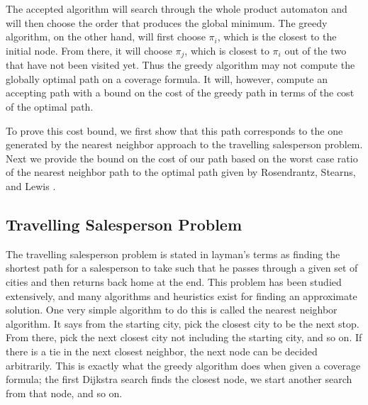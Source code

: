 The accepted algorithm will search through the whole product automaton and will then choose the order that produces the global minimum. The greedy algorithm, on the other hand, will first choose $\pi_i$, which is the closest to the initial node. From there, it will choose $\pi_j$, which is closest to $\pi_i$ out of the two that have not been visited yet. Thus the greedy algorithm may not compute the globally optimal path on a coverage formula. It will, however, compute an accepting path with a bound on the cost of the greedy path in terms of the cost of the optimal path. 

To prove this cost bound, we first show that this path corresponds to the one generated by the nearest neighbor approach to the travelling salesperson problem. Next we provide the bound on the cost of our path based on the worst case ratio of the nearest neighbor path to the optimal path given by Rosendrantz, Stearns, and Lewis \cite{rosenkrantz74}. 

\subsection{Travelling Salesperson Problem}
The travelling salesperson problem is stated in layman's terms as finding the shortest path for a salesperson to take such that he passes through a given set of cities and then returns back home at the end. This problem has been studied extensively, and many algorithms and heuristics exist for finding an approximate solution. One very simple algorithm to do this is called the nearest neighbor algorithm. It says from the starting city, pick the closest city to be the next stop. From there, pick the next closest city not including the starting city, and so on. If there is a tie in the next closest neighbor, the next node can be decided arbitrarily. This is exactly what the greedy algorithm does when given a coverage formula; the first Dijkstra search finds the closest node, we start another search from that node, and so on. 

